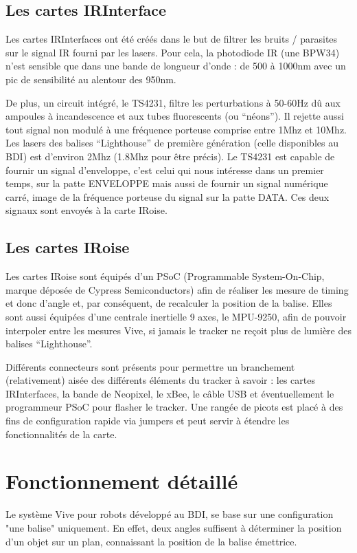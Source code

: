 \subsection{Les cartes IRInterface}

Les cartes IRInterfaces ont été créés dans le but de filtrer les bruits / parasites sur le signal IR fourni par les lasers. Pour cela, la photodiode IR (une BPW34) n'est sensible que dans une bande de longueur d'onde : de 500 à 1000nm avec un pic de sensibilité au alentour des 950nm.

De plus, un circuit intégré, le TS4231, filtre les perturbations à 50-60Hz dû aux ampoules à incandescence et aux tubes fluorescents (ou "`néons"'). Il rejette aussi tout signal non modulé à une fréquence porteuse comprise entre 1Mhz et 10Mhz. Les lasers des balises "`Lighthouse"' de première génération (celle disponibles au BDI) est d'environ 2Mhz (1.8Mhz pour être précis). Le TS4231 est capable de fournir un signal d'enveloppe, c'est celui qui nous intéresse dans un premier temps, sur la patte ENVELOPPE mais aussi de fournir un signal numérique carré, image de la fréquence porteuse du signal sur la patte DATA. Ces deux signaux sont envoyés à la carte IRoise.


\subsection{Les cartes IRoise}

Les cartes IRoise sont équipés d'un PSoC (Programmable System-On-Chip, marque déposée de Cypress Semiconductors) afin de réaliser les mesure de timing et donc d'angle et, par conséquent, de recalculer la position de la balise. Elles sont aussi équipées d'une centrale inertielle 9 axes, le MPU-9250, afin de pouvoir interpoler entre les mesures Vive, si jamais le tracker ne reçoit plus de lumière des balises "`Lighthouse"'.

Différents connecteurs sont présents pour permettre un branchement (relativement) aisée des différents éléments du tracker à savoir : les cartes IRInterfaces, la bande de Neopixel, le xBee, le câble USB et éventuellement le programmeur PSoC pour flasher le tracker. Une rangée de picots est placé à des fins de configuration rapide via jumpers et peut servir à étendre les fonctionnalités de la carte.


\section{Fonctionnement détaillé}

Le système Vive pour robots développé au BDI, se base sur une configuration "une balise" uniquement. En effet, deux angles suffisent à déterminer la position d'un objet sur un plan, connaissant la position de la balise émettrice.